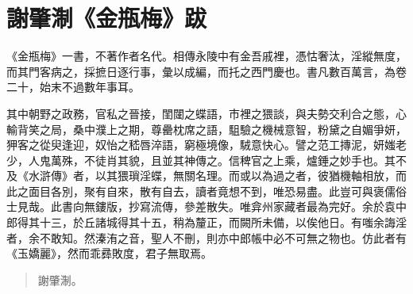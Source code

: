 \chapter*{謝肇淛《金瓶梅》跋}

《金瓶梅》一書，不著作者名代。相傳永陵中有金吾戚裡，憑怙奢汰，淫縱無度，而其門客病之，採摭日逐行事，彙以成編，而托之西門慶也。書凡數百萬言，為卷二十，始末不過數年事耳。

其中朝野之政務，官私之晉接，閨闥之蝶語，市裡之猥談，與夫勢交利合之態，心輸背笑之局，桑中濮上之期，尊罍枕席之語，駔驗之機械意智，粉黛之自媚爭妍，狎客之從臾逢迎，奴怡之嵇唇淬語，窮極境像，駥意快心。譬之范工摶泥，妍媸老少，人鬼萬殊，不徒肖其貌，且並其神傳之。信稗官之上乘，爐錘之妙手也。其不及《水滸傳》者，以其猥瑣淫蝶，無關名理。而或以為過之者，彼猶機軸相放，而此之面目各別，聚有自來，散有自去，讀者竟想不到，唯恐易盡。此豈可與褒儒俗士見哉。此書向無鏤版，抄寫流傳，參差散失。唯弇州家藏者最為完好。余於袁中郎得其十三，於丘諸城得其十五，稍為釐正，而闕所未備，以俟他日。有嗤余誨淫者，余不敢知。然溱洧之音，聖人不刪，則亦中郎帳中必不可無之物也。仿此者有《玉嬌麗》，然而乖彞敗度，君子無取焉。
  
\begin{quotation}\begin{flushright}謝肇淛。\end{flushright}\end{quotation}

